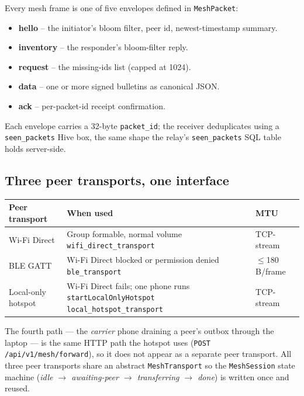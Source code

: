 \documentclass[11pt,a4paper]{article}
\begin{document}
Every mesh frame is one of five envelopes defined in
\texttt{MeshPacket}:
\begin{itemize}[leftmargin=*]
  \item \textbf{hello} -- the initiator's bloom filter, peer id,
        newest-timestamp summary.
  \item \textbf{inventory} -- the responder's bloom-filter reply.
  \item \textbf{request} -- the missing-ids list (capped at 1024).
  \item \textbf{data} -- one or more signed bulletins as canonical
        JSON.
  \item \textbf{ack} -- per-packet-id receipt confirmation.
\end{itemize}
Each envelope carries a 32-byte \texttt{packet\_id}; the receiver
deduplicates using a \texttt{seen\_packets} Hive box, the same shape
the relay's \texttt{seen\_packets} SQL table holds server-side.

\subsection{Three peer transports, one interface}
\label{sec:transports}

\begin{center}
\begin{tabularx}{\linewidth}{@{}p{3.2cm} X p{2.6cm}@{}}
\toprule
\textbf{Peer transport} & \textbf{When used} & \textbf{MTU}\\
\midrule
Wi-Fi Direct &
Group formable, normal volume \newline \scriptsize\texttt{wifi\_direct\_transport} & TCP-stream\\
BLE GATT &
Wi-Fi Direct blocked or permission denied \newline \scriptsize\texttt{ble\_transport} & $\le$180\,B/frame\\
Local-only hotspot &
Wi-Fi Direct fails; one phone runs \texttt{startLocalOnlyHotspot} \newline \scriptsize\texttt{local\_hotspot\_transport} & TCP-stream\\
\bottomrule
\end{tabularx}
\end{center}

The fourth path --- the \emph{carrier} phone draining a peer's
outbox through the laptop --- is the same HTTP path the hotspot uses
(\texttt{POST /api/v1/mesh/forward}), so it does not appear as a
separate peer transport. All three peer transports share an abstract
\texttt{MeshTransport} so the \texttt{MeshSession} state machine
(\emph{idle $\to$ awaiting-peer $\to$ transferring $\to$ done}) is
written once and reused.
\end{document}
